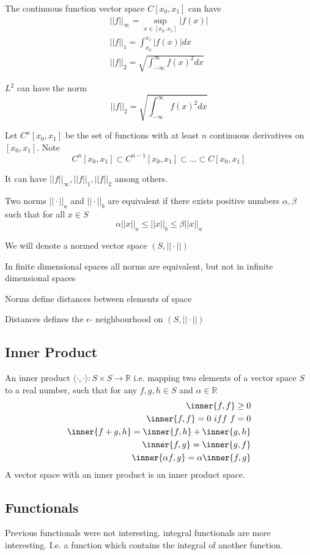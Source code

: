 \documentclass{X:/Documents/Coding/Latex/myassignment}
\begin{document}
The continuous function vector space $C[x_0,x_1]$ can have 
\begin{align*}
	||f||_\infty = \sup_{x \in [x_0,x_1]} |f(x)|\\
	||f||_1 = \int_{x_0}^{x_1} |f(x)| dx\\
	||f||_2 = \sqrt{\int_{-\infty}^\infty f(x)^2 dx}	
\end{align*}


$L^2$ can have the norm
\[||f||_2 = \sqrt{\int_{-\infty}^\infty f(x)^2 dx}\]


Let $C^n[x_0,x_1]$ be the set of functions with at least $n$ continuous derivatives on $[x_0,x_1]$. Note
\[C^n[x_0,x_1] \subset C^{n-1}[x_0,x_1] \subset \ldots \subset C[x_0,x_1]\]

It can have $||f||_\infty, ||f||_1, ||f||_2$ among others.

Two norms $||\cdot||_a$ and $||\cdot||_b$ are equivalent if there exists positive numbers $\alpha,\beta$ such that for all $x \in S$
\[\alpha||x||_a \leq ||x||_b \leq \beta ||x||_a\]

We will denote a normed vector space $(S,||\cdot||)$

In finite dimensional spaces all norms are equivalent, but not in infinite dimensional spaces

Norms define distances between elements of space

Distances defines the $\epsilon$- neighbourhood on $(S,||\cdot||)$

\subsection{Inner Product}
An inner product $\langle \cdot,\cdot\rangle : S\times S \to \mathbb{R}$ i.e. mapping two elements of a vector space $S$ to a real number, such that for any $f,g,h\in S$ and $\alpha \in \mathbb{R}$
\begin{align*}
	\inner{f,f} \geq 0\\
	\inner{f,f} = 0 \ iff \ f=0\\
	\inner{f+g,h} = \inner{f,h} + \inner{g,h}\\
	\inner{f,g} = \inner{g,f}\\
	\inner{\alpha f,g} = \alpha\inner{f,g}\\	
\end{align*}
A vector space with an inner product is an inner product space.

\subsection{Functionals}
Previous functionals were not interesting. integral functionals are more interesting. I.e. a function which contains the integral of another function.
\end{document}
